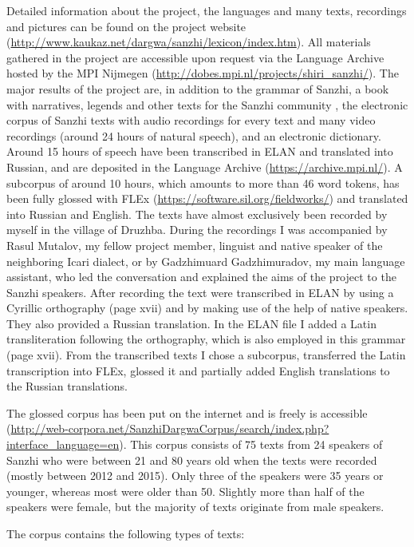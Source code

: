\sloppy Detailed information about the project, the languages and many texts, recordings and pictures can be found on the project website (\url{http://www.kaukaz.net/dargwa/sanzhi/lexicon/index.htm}). All materials gathered in the project are accessible upon request via the Language Archive hosted by the MPI Nijmegen (\url{http://dobes.mpi.nl/projects/shiri_sanzhi/}). The major results of the project are, in addition to the grammar of Sanzhi, a book with narratives, legends and other texts for the Sanzhi community \citep{Forker.Gadzhimuradov2017}, the electronic corpus of Sanzhi texts with audio recordings for every text and many video recordings (around 24 hours of natural speech), and an electronic dictionary. Around 15 hours of speech have been transcribed in ELAN and translated into Russian, and are deposited in the Language Archive (\url{https://archive.mpi.nl/}). A subcorpus of around 10 hours, which amounts to more than 46 word tokens, has been fully glossed with FLEx (\url{https://software.sil.org/fieldworks/}) and translated into Russian and English. The texts have almost exclusively been recorded by myself in the village of Druzhba. During the recordings I was accompanied by Rasul Mutalov, my fellow project member, linguist and native speaker of the neighboring Icari dialect, or by Gadzhimuard Gadzhimuradov, my main language assistant, who led the conversation and explained the aims of the project to the Sanzhi speakers. After recording the text were transcribed in ELAN by using a Cyrillic orthography (page xvii) and by making use of the help of native speakers. They also provided a Russian translation. In the ELAN file I added a Latin transliteration following the orthography, which is also employed in this grammar (page xvii). From the transcribed texts I chose a subcorpus, transferred the Latin transcription into FLEx, glossed it and partially added English translations to the Russian translations.

The glossed corpus has been put on the internet and is freely is accessible (\url{http://web-corpora.net/SanzhiDargwaCorpus/search/index.php?interface_language=en}). This corpus consists of 75 texts from 24 speakers of Sanzhi who were between 21 and 80 years old when the texts were recorded (mostly between 2012 and 2015). Only three of the speakers were 35 years or younger, whereas most were older than 50. Slightly more than half of the speakers were female, but the majority of texts originate from male speakers. 

The corpus contains the following types of texts:

